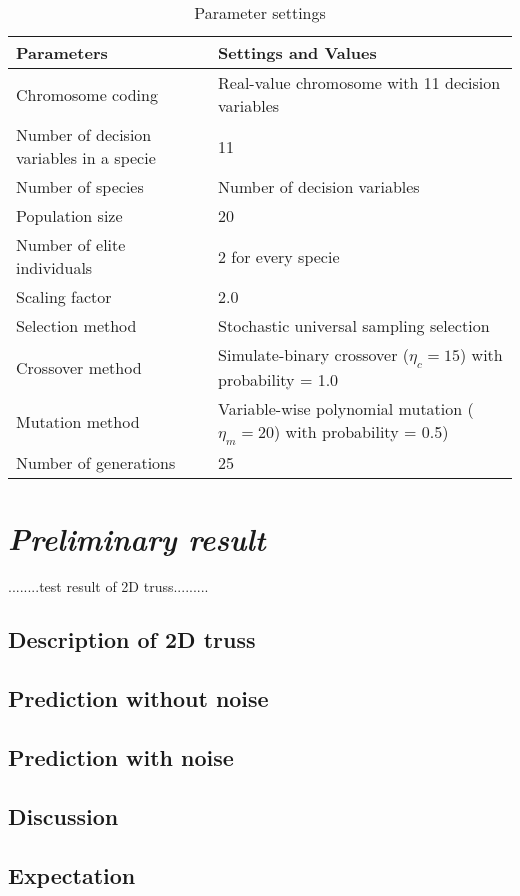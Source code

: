 \begin{table}[h]
\caption{Parameter settings}
\label{parameter_settings}
\begin{tabularx}{\textwidth}{ p{5cm}X }
\toprule
  Parameters & Settings and Values \\
\midrule
Chromosome coding & Real-value chromosome with 11 decision variables\\
Number of decision variables in a specie & 11 \\
Number of species & Number of decision variables \\
Population size & 20 \\
Number of elite individuals & 2 for every specie \\
Scaling factor & 2.0 \\
Selection method & Stochastic universal sampling selection \\
Crossover method & Simulate-binary crossover ($\eta_c=15$) with probability = 1.0 \\
Mutation method & Variable-wise polynomial mutation ($\eta_m=20$) with probability = 0.5) \\
Number of generations & 25 \\
\bottomrule
\end{tabularx}
\end{table}


\section{\emph{Preliminary result}}

........test result of 2D truss.........
\subsection*{Description of 2D truss}

\subsection*{Prediction without noise}

\subsection*{Prediction with noise}
\subsection*{Discussion}
\subsection*{Expectation}
